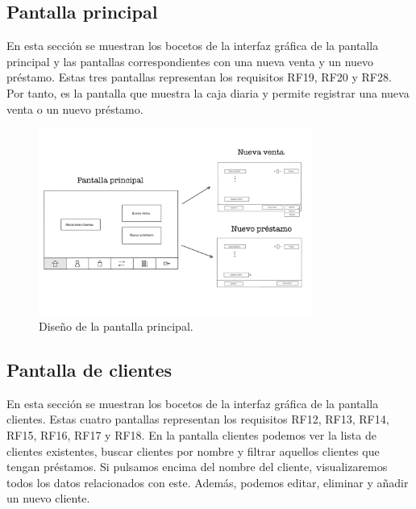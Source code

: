 \newpage

\subsection{Pantalla principal}

En esta sección se muestran los bocetos de la interfaz gráfica de la pantalla principal y las pantallas correspondientes con una nueva venta y un nuevo préstamo. Estas tres pantallas representan los requisitos RF19, RF20 y RF28. Por tanto, es la pantalla que muestra la caja diaria y permite registrar una nueva venta o un nuevo préstamo. 

\begin{figure}[ht]
	\centering
	\includegraphics[width=0.8\textwidth, angle=270]{imagenes/pantalla_principal.JPG}
	\caption{Diseño de la pantalla principal.}
	\label{fig:pantallaprincipal}
\end{figure}

\newpage

\subsection{Pantalla de clientes}

En esta sección se muestran los bocetos de la interfaz gráfica de la pantalla clientes. Estas cuatro pantallas representan los requisitos RF12, RF13, RF14, RF15, RF16, RF17 y RF18. En la pantalla clientes podemos ver la lista de clientes existentes, buscar clientes por nombre y filtrar aquellos clientes que tengan préstamos. Si pulsamos encima del nombre del cliente, visualizaremos todos los datos relacionados con este. Además, podemos editar, eliminar y añadir un nuevo cliente. 


